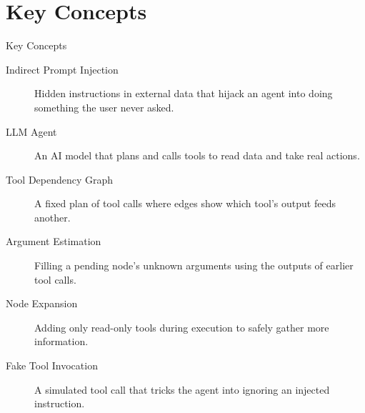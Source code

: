 \documentclass[10pt]{beamer}
\begin{document}
\section{Key Concepts}
\begin{frame}[allowframebreaks]{Key Concepts}
  \begin{description}
    \item[Indirect Prompt Injection] Hidden instructions in external data that hijack an agent into doing something the user never asked.
    \item[LLM Agent] An AI model that plans and calls tools to read data and take real actions.
    \item[Tool Dependency Graph] A fixed plan of tool calls where edges show which tool's output feeds another.
    \item[Argument Estimation] Filling a pending node's unknown arguments using the outputs of earlier tool calls.
    \item[Node Expansion] Adding only read-only tools during execution to safely gather more information.
    \item[Fake Tool Invocation] A simulated tool call that tricks the agent into ignoring an injected instruction.
  \end{description}
\end{frame}
\end{document}
